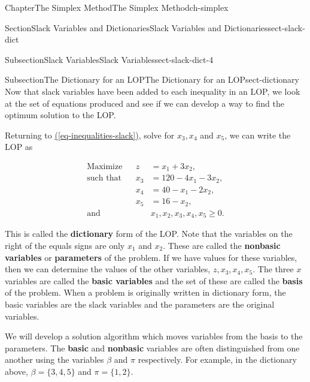 \documentclass[oneside,10pt,]{book}
\newcommand{\xreffont}{\relax}
\newcommand{\terminology}[1]{\textbf{#1}}
\numberwithin{equation}{section}
\newcommand{\amp}{&}
\begin{document}
\begin{chapterptx}{Chapter}{The Simplex Method}{}{The Simplex Method}{}{}{ch-simplex}
\begin{sectionptx}{Section}{Slack Variables and Dictionaries}{}{Slack Variables and Dictionaries}{}{}{sect-slack-dict}
\begin{subsectionptx}{Subsection}{Slack Variables}{}{Slack Variables}{}{}{sect-slack-dict-4}
\end{subsectionptx}
%
%
\typeout{************************************************}
\typeout{************************************************}
%
\begin{subsectionptx}{Subsection}{The Dictionary for an LOP}{}{The Dictionary for an LOP}{}{}{sect-dictionary}
Now that slack variables have been added to each inequality in an LOP, we look at the set of equations produced and see if we can develop a way to find the optimum solution to the LOP.%
\par
Returning to \hyperref[eq-inequalities-slack]{({\xreffont\ref{eq-inequalities-slack}})}, solve for \(x_3, x_4\) and \(x_5\), we can write the LOP as%
\par
%
\begin{equation}
\begin{aligned} \text{Maximize}\amp \amp   z  \amp = x_1 + 3x_2,  \\ \text{such that}\amp \amp  x_3  \amp = 120 - 4 x_1 -3x_2, \\ \amp \amp x_4  \amp = 40 - x_1 - 2x_2, \\ \amp \amp x_5  \amp = 16 - x_2,  \\ \text{and}\amp\amp \amp x_1, x_2, x_3, x_4, x_5 \geq 0.
\end{aligned}\label{eq-dict-LOP1}
\end{equation}
%
\par
This is called the \terminology{dictionary} form of the LOP. Note that the variables on the right of the equals signs are only \(x_1\) and \(x_2\). These are called the \terminology{nonbasic variables} or \terminology{parameters} of the problem. If we have values for these variables, then we can determine the values of the other variables, \(z, x_3, x_4, x_5\). The three \(x\) variables are called the \terminology{basic variables} and the set of these are called the \terminology{basis} of the problem. When a problem is originally written in dictionary form, the basic variables are the slack variables and the parameters are the original variables.%
\par
We will develop a solution algorithm which moves variables from the basis to the parameters. The \terminology{basic} and \terminology{nonbasic} variables are often distinguished from one another using the variables \(\beta\) and \(\pi\) respectively. For example, in the dictionary above, \(\beta=\{3,4,5\}\) and \(\pi=\{1,2\}\).%
\par

\end{subsectionptx}
\end{sectionptx}
\end{chapterptx}
\end{document}
